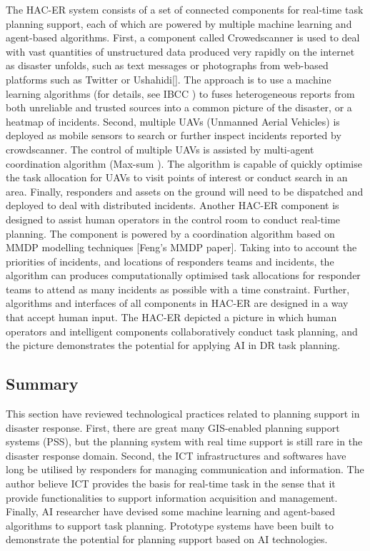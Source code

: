 The HAC-ER system consists of a set of connected components for real-time task planning support, each of which are powered by multiple machine learning and agent-based algorithms. First, a component called Crowedscanner is used to deal with vast quantities of unstructured data produced very rapidly on the internet as disaster unfolds, such as text messages or photographs from web-based platforms such as Twitter or Ushahidi[]. The approach is to use a machine learning algorithms (for details, see IBCC \cite{Simpson}) to fuses heterogeneous reports from both unreliable and trusted sources into a common picture of the disaster, or a heatmap of incidents. Second, multiple  UAVs (Unmanned Aerial Vehicles) is deployed as mobile sensors to search or further inspect incidents reported by crowdscanner. The control of multiple UAVs is assisted by multi-agent coordination algorithm (Max-sum \cite{Ramchurn2010}). The algorithm is capable of quickly optimise the task allocation for UAVs to visit points of interest or conduct search in an area.  Finally, responders and assets on the ground will need to be dispatched and deployed to deal with distributed incidents. Another HAC-ER component is designed to assist human operators in the control room to conduct real-time planning. The component is powered by a coordination algorithm based on MMDP modelling techniques [Feng's MMDP paper]. Taking into to account the priorities of incidents, and locations of responders teams and incidents, the algorithm can produces computationally optimised task allocations for responder teams to attend as many incidents as possible with a time constraint. Further, algorithms and interfaces of all components in HAC-ER are designed in a way that accept human input. The HAC-ER depicted a picture in which human operators and intelligent components collaboratively conduct task planning, and the picture demonstrates the potential for applying AI in DR task planning.\\

\subsection{Summary}
This section have reviewed technological practices related to planning support in disaster response. First, there are great many GIS-enabled planning support systems (PSS), but the planning system with real time support is still rare in the disaster response domain. Second, the ICT infrastructures and softwares have long be utilised by responders for managing communication and information. The author believe ICT provides the basis for real-time task in the sense that it provide functionalities to support information acquisition and management. Finally, AI researcher have devised some machine learning and agent-based algorithms to support task planning. Prototype systems have been built to demonstrate the potential for planning support based on AI technologies.\\ 

